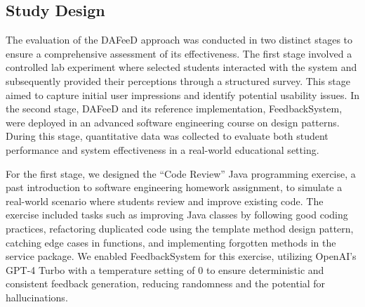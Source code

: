 \documentclass[sigconf,screen,review,anonymous]{acmart}
\begin{document}

\subsection{Study Design}
The evaluation of the DAFeeD approach was conducted in two distinct stages to ensure a comprehensive assessment of its effectiveness.
The first stage involved a controlled lab experiment where selected students interacted with the system and subsequently provided their perceptions through a structured survey.
This stage aimed to capture initial user impressions and identify potential usability issues.
In the second stage, DAFeeD and its reference implementation, FeedbackSystem, were deployed in an advanced software engineering course on design patterns.
During this stage, quantitative data was collected to evaluate both student performance and system effectiveness in a real-world educational setting.


For the first stage, we designed the ``Code Review'' Java programming exercise, a past introduction to software engineering homework assignment, to simulate a real-world scenario where students review and improve existing code.
The exercise included tasks such as improving Java classes by following good coding practices, refactoring duplicated code using the template method design pattern, catching edge cases in functions, and implementing forgotten methods in the service package.
We enabled FeedbackSystem for this exercise, utilizing OpenAI's GPT-4 Turbo with a temperature setting of 0 to ensure deterministic and consistent feedback generation, reducing randomness and the potential for hallucinations.
\end{document}
